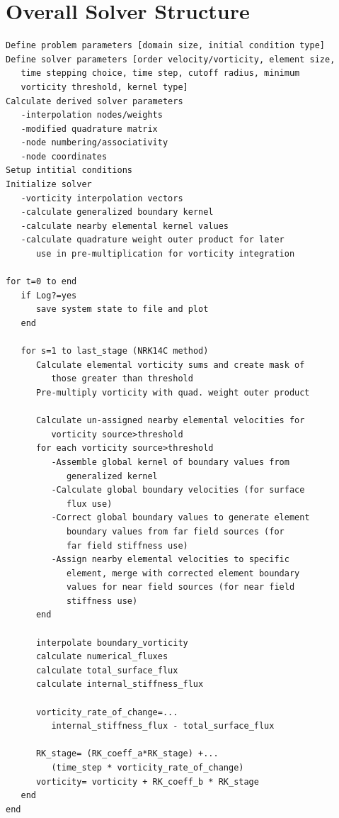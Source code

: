 \documentclass[letterpaper,12pt]{report}
\begin{document}
\section{Overall Solver Structure}
\vspace{-1cm}
\singlespacing
\begin{lstlisting}
Define problem parameters [domain size, initial condition type]
Define solver parameters [order velocity/vorticity, element size,
   time stepping choice, time step, cutoff radius, minimum
   vorticity threshold, kernel type]
Calculate derived solver parameters
   -interpolation nodes/weights
   -modified quadrature matrix
   -node numbering/associativity
   -node coordinates
Setup intitial conditions
Initialize solver
   -vorticity interpolation vectors
   -calculate generalized boundary kernel
   -calculate nearby elemental kernel values
   -calculate quadrature weight outer product for later
      use in pre-multiplication for vorticity integration

for t=0 to end
   if Log?=yes
      save system state to file and plot
   end

   for s=1 to last_stage (NRK14C method)
      Calculate elemental vorticity sums and create mask of
         those greater than threshold
      Pre-multiply vorticity with quad. weight outer product
      
      Calculate un-assigned nearby elemental velocities for
         vorticity source>threshold
      for each vorticity source>threshold
         -Assemble global kernel of boundary values from 
            generalized kernel
         -Calculate global boundary velocities (for surface
            flux use)
         -Correct global boundary values to generate element
            boundary values from far field sources (for
            far field stiffness use)
         -Assign nearby elemental velocities to specific
            element, merge with corrected element boundary
            values for near field sources (for near field
            stiffness use)
      end

      interpolate boundary_vorticity
      calculate numerical_fluxes
      calculate total_surface_flux
      calculate internal_stiffness_flux
		
      vorticity_rate_of_change=...
         internal_stiffness_flux - total_surface_flux
		
      RK_stage= (RK_coeff_a*RK_stage) +...
         (time_step * vorticity_rate_of_change)
      vorticity= vorticity + RK_coeff_b * RK_stage
   end
end
\end{lstlisting}
\doublespacing
\end{document}
